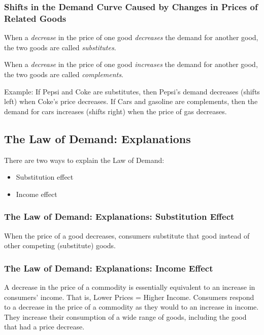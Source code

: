 \documentclass[
  letterpaper,
]{book}
\providecommand{\tightlist}{%
  \setlength{\itemsep}{0pt}\setlength{\parskip}{0pt}}\usepackage{longtable,booktabs,array}
\begin{document}
\subsubsection{Shifts in the Demand Curve Caused by Changes in Prices of
Related
Goods}\label{shifts-in-the-demand-curve-caused-by-changes-in-prices-of-related-goods}

When a \emph{decrease} in the price of one good \emph{decreases} the
demand for another good, the two goods are called \emph{substitutes}.

When a \emph{decrease} in the price of one good \emph{increases} the
demand for another good, the two goods are called \emph{complements}.

Example: If Pepsi and Coke are substitutes, then Pepsi's demand
decreases (shifts left) when Coke's price decreases. If Cars and
gasoline are complements, then the demand for cars increases (shifts
right) when the price of gas decreases.

\subsection{The Law of Demand:
Explanations}\label{the-law-of-demand-explanations}

There are two ways to explain the Law of Demand:

\begin{itemize}
\tightlist
\item
  Substitution effect
\item
  Income effect
\end{itemize}

\subsubsection{The Law of Demand: Explanations: Substitution
Effect}\label{the-law-of-demand-explanations-substitution-effect}

When the price of a good decreases, consumers substitute that good
instead of other competing (substitute) goods.

\subsubsection{The Law of Demand: Explanations: Income
Effect}\label{the-law-of-demand-explanations-income-effect}

A decrease in the price of a commodity is essentially equivalent to an
increase in consumers' income. That is, Lower Prices = Higher Income.
Consumers respond to a decrease in the price of a commodity as they
would to an increase in income. They increase their consumption of a
wide range of goods, including the good that had a price decrease.
\end{document}
